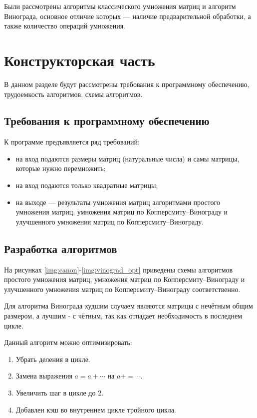 Были рассмотрены алгоритмы классического умножения матриц и алгоритм Винограда, основное отличие которых — наличие предварительной обработки, а также количество операций умножения.

\section{Конструкторская часть}

В данном разделе будут рассмотрены требования к программному обеспечению, трудоемкость алгоритмов, схемы алгоритмов.

\subsection{Требования к программному обеспечению}

К программе предъявляется ряд требований:
\begin{itemize}
    \item на вход подаются размеры матриц (натуральные числа) и самы матрицы, которые нужно перемножить;
    \item на вход подаются только квадратные матрицы;
    \item на выходе — результаты умножения матриц алгоритмами простого умножения матриц, умножения матриц по Копперсмиту–Винограду и улучшенного умножения матриц по Копперсмиту–Винограду.
\end{itemize}


\subsection{Разработка алгоритмов}

На рисунках \ref{img:canon}-\ref{img:vinograd_opt} приведены схемы алгоритмов простого умножения матриц, умножения матриц по Копперсмиту–Винограду и улучшенного умножения матриц по Копперсмиту–Винограду соответственно.

Для алгоритма Винограда худшим случаем являются матрицы с нечётным общим размером, а лучшим - с чётным, так как отпадает необходимость в последнем цикле.

Данный алгоритм можно оптимизировать:

\begin{enumerate}
    \item Убрать деления в цикле.
    \item Замена выражения $a = a + \cdots $ на $a += \cdots$.
    \item Увеличить шаг в цикле до 2.
    \item Добавлен кэш во внутреннем цикле тройного цикла.
\end{enumerate}

